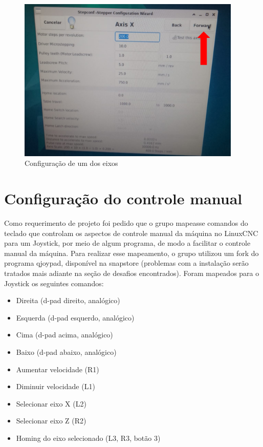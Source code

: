 \begin{figure}[H]
    \begin{center}
        \includegraphics[width=0.95\textwidth]{images/Eletrica/Figura8.png} %
    \end{center}
    \caption{Configuração de um dos eixos}\label{eixos}
\end{figure}

\section{Configuração do controle manual}

Como requerimento de projeto foi pedido que o grupo mapeasse comandos do teclado que controlam os aspectos de controle manual da máquina no LinuxCNC para um Joystick, por meio de algum programa, de modo a facilitar o controle manual da máquina. Para realizar esse mapeamento, o grupo utilizou um fork do programa qjoypad, disponível na snapstore (problemas com a instalação serão tratados mais adiante na seção de desafios encontrados).
Foram mapeados para o Joystick os seguintes comandos:

\begin{itemize}
    \item Direita (d-pad direito, analógico) 
    \item Esquerda (d-pad esquerdo, analógico)
    \item Cima (d-pad acima, analógico)
    \item Baixo (d-pad abaixo, analógico)
    \item Aumentar velocidade (R1) 
    \item Diminuir velocidade (L1)
    \item Selecionar eixo X (L2)
    \item Selecionar eixo Z (R2)
    \item Homing do eixo selecionado (L3, R3, botão 3)
\end{itemize}

